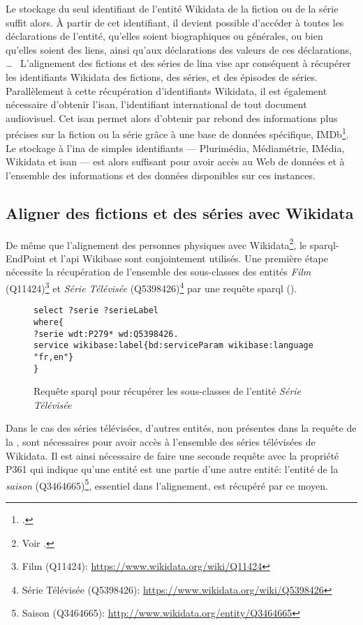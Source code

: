 Le stockage du seul identifiant de l'entité Wikidata de la fiction ou de la série suffit alors. À partir de cet identifiant, il devient possible d'accéder à toutes les déclarations de l'entité, qu'elles soient biographiques ou générales, ou bien qu'elles soient des liens, ainsi qu'aux déclarations des valeurs de ces déclarations, \dots~ L'alignement des fictions et des séries de l\ac{ina} vise apr conséquent à récupérer les identifiants Wikidata des fictions, des séries, et des épisodes de séries.\\

Parallèlement à cette récupération d'identifiants Wikidata, il est également nécessaire d'obtenir l'\ac{isan}, l'identifiant international de tout document audiovisuel. Cet \ac{isan} permet alors d'obtenir par rebond des informations plus précises sur la fiction ou la série grâce à une base de données spécifique, IMDb\footcite{noauthor_imdb_nodate}. Le stockage à l'\ac{ina} de simples identifiants --- Plurimédia, Médiamétrie, IMédia, Wikidata et \ac{isan} --- est alors suffisant pour avoir accès au Web de données et à l'ensemble des informations et des données disponibles sur ces instances.

\subsection{\label{III-A-3-b}Aligner des fictions et des séries avec Wikidata}

De même que l'alignement des personnes physiques avec Wikidata\footnote{Voir .}, le \ac{sparql}-EndPoint et l'\ac{api} Wikibase sont conjointement utilisés. Une première étape nécessite la récupération de l'ensemble des sous-classes des entités \textit{Film} (Q11424)\footnote{Film (Q11424): \url{https://www.wikidata.org/wiki/Q11424}} et \textit{Série Télévisée} (Q5398426)\footnote{Série Télévisée (Q5398426): \url{https://www.wikidata.org/wiki/Q5398426}} par une requête \ac{sparql} ().
\begin{figure}[!h]
	\centering
	\begin{verbatim}
select ?serie ?serieLabel
where{
?serie wdt:P279* wd:Q5398426.
service wikibase:label{bd:serviceParam wikibase:language "fr,en"}
}
	\end{verbatim}
	\caption{Requête \ac{sparql} pour récupérer les sous-classes de l'entité \textit{Série Télévisée}}
	\label{sparql_1}
\end{figure}
Dans le cas des séries télévisées, d'autres entités, non présentes dans la requête de la , sont nécessaires pour avoir accès à l'ensemble des séries télévisées de Wikidata. Il est ainsi nécessaire de faire une seconde requête avec la propriété P361 qui indique qu'une entité est \og une partie d'\fg{}une autre entité: l'entité de la \textit{saison} (Q3464665)\footnote{Saison (Q3464665): \url{http://www.wikidata.org/entity/Q3464665}}, essentiel dans l'alignement, est récupéré par ce moyen.\\

